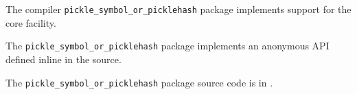 
The compiler {\tt pickle\_symbol\_or\_picklehash} package implements support for the 
core  facility.

The {\tt pickle\_symbol\_or\_picklehash} package implements an anonymous API defined inline in the source.

The {\tt pickle\_symbol\_or\_picklehash} package source code is in .

